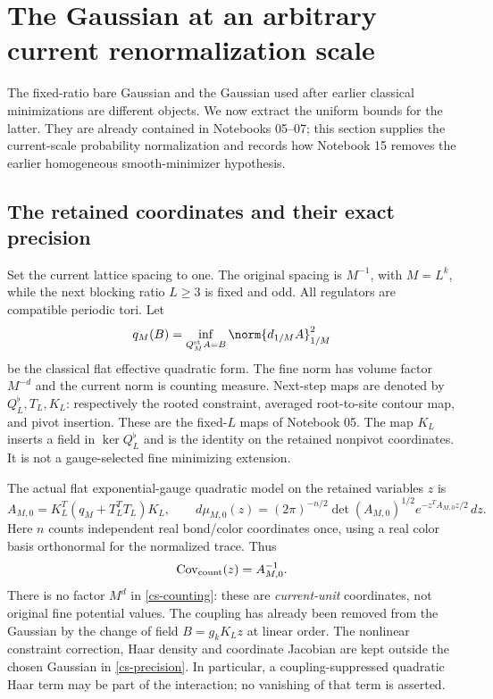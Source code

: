 \section{The Gaussian at an arbitrary current renormalization scale}
\label{cs-section}

The fixed-ratio bare Gaussian and the Gaussian used after earlier
classical minimizations are different objects. We now extract the
uniform bounds for the latter. They are already contained in
Notebooks 05--07; this section supplies the current-scale probability
normalization and records how Notebook 15 removes the earlier
homogeneous smooth-minimizer hypothesis.

\subsection{The retained coordinates and their exact precision}

Set the current lattice spacing to one. The original spacing is
$M^{-1}$, with $M=L^k$, while the next blocking ratio $L\ge3$ is fixed
and odd. All regulators are compatible periodic tori. Let
\[
 q_M(B)=\inf_{Q_M^{\rm st}A=B}\norm{d_{1/M}A}_{1/M}^2
\]
be the classical flat effective quadratic form. The fine norm has
volume factor $M^{-d}$ and the current norm is counting measure.
Next-step maps are denoted by $Q_L^\flat,T_L,K_L$: respectively the
rooted constraint, averaged root-to-site contour map, and pivot
insertion. These are the fixed-$L$ maps of Notebook 05. The map
$K_L$ inserts a field in $\ker Q_L^\flat$ and is the identity on
the retained nonpivot coordinates. It is not a gauge-selected
fine minimizing extension.

The actual flat exponential-gauge quadratic model on the retained
variables $z$ is
\begin{equation}\label{cs-precision}
 A_{M,0}=K_L^T(q_M+T_L^TT_L)K_L,\qquad
 d\mu_{M,0}(z)=
 (2\pi)^{-n/2}\det(A_{M,0})^{1/2}
 e^{-z^TA_{M,0}z/2}\,dz .
\end{equation}
Here $n$ counts independent real bond/color coordinates once, using
a real color basis orthonormal for the normalized trace. Thus
\begin{equation}\label{cs-counting}
 \operatorname{Cov}_{\rm count}(z)=A_{M,0}^{-1}.
\end{equation}
There is no factor $M^d$ in \eqref{cs-counting}: these are
\emph{current-unit} coordinates, not original fine potential values.
The coupling has already been removed from the Gaussian by the
change of field $B=g_kK_Lz$ at linear order. The nonlinear constraint
correction, Haar density and coordinate Jacobian are kept outside
the chosen Gaussian in \eqref{cs-precision}. In particular, a
coupling-suppressed quadratic Haar term may be part of the
interaction; no vanishing of that term is asserted.

